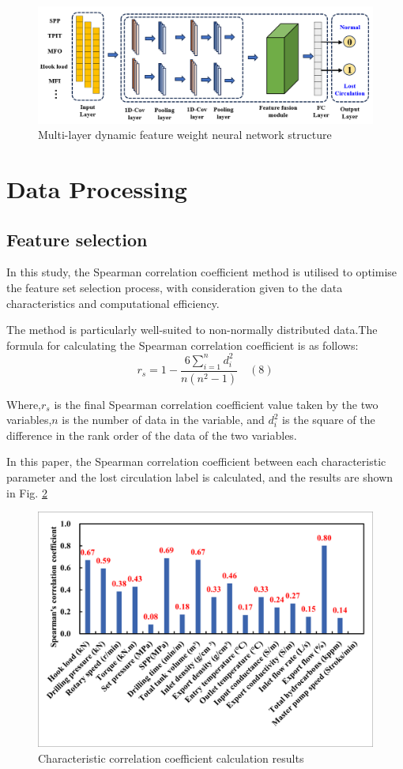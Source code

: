 \documentclass[journal,article,submit,pdftex,moreauthors]{Definitions/mdpi}
\begin{document}
\begin{figure}[h]
    \centering
    \includegraphics[width=0.75\linewidth]{图片/多尺度融合网络.png}
    \caption{Multi-layer dynamic feature weight neural network structure}
    \label{fig:Multi-layer dynamic feature weight neural network structure}
\end{figure}

\section{Data Processing}
\subsection{Feature selection}

In this study, the Spearman correlation coefficient method is utilised to optimise the feature set selection process, with consideration given to the data characteristics and computational efficiency.

The method is particularly well-suited to non-normally distributed data.The formula for calculating the Spearman correlation coefficient is as follows:
\[{{r}_{s}}=1-\frac{6\sum\limits_{i=1}^{n}{d_{i}^{2}}}{n\left( {{n}^{2}}-1 \right)}\quad (8)\]

Where,\({{r}_{s}}\) is the final Spearman correlation coefficient value taken by the two variables,\(n\) is the number of data in the variable, and  \(d_{i}^{2}\) is the square of the difference in the rank order of the data of the two variables.


In this paper, the Spearman correlation coefficient between each characteristic parameter and the lost circulation label is calculated, and the results are shown in Fig.  \ref{fig:Characteristic correlation coefficient calculation results}

\begin{figure}[h]
    \centering
    \includegraphics[width=0.75\linewidth]{图片/spearman.png}
    \caption{Characteristic correlation coefficient calculation results}
    \label{fig:Characteristic correlation coefficient calculation results}
\end{figure}
\end{document}
